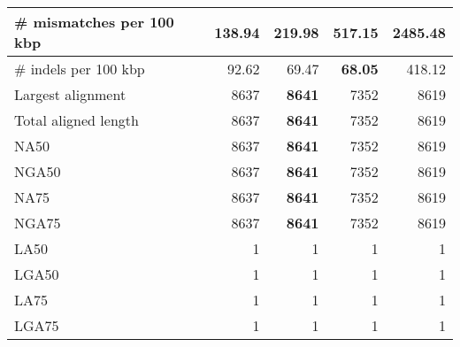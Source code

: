 \documentclass[12pt,a4paper]{article}
\begin{document}
\begin{table}[ht]
\begin{center}
\begin{tabular}{|l*{4}{|r}|}
\# mismatches per 100 kbp & {\bf 138.94} & 219.98 & 517.15 & 2485.48 \\ \hline
\# indels per 100 kbp & 92.62 & 69.47 & {\bf 68.05} & 418.12 \\ \hline
Largest alignment & 8637 & {\bf 8641} & 7352 & 8619 \\ \hline
Total aligned length & 8637 & {\bf 8641} & 7352 & 8619 \\ \hline
NA50 & 8637 & {\bf 8641} & 7352 & 8619 \\ \hline
NGA50 & 8637 & {\bf 8641} & 7352 & 8619 \\ \hline
NA75 & 8637 & {\bf 8641} & 7352 & 8619 \\ \hline
NGA75 & 8637 & {\bf 8641} & 7352 & 8619 \\ \hline
LA50 & 1 & 1 & 1 & 1 \\ \hline
LGA50 & 1 & 1 & 1 & 1 \\ \hline
LA75 & 1 & 1 & 1 & 1 \\ \hline
LGA75 & 1 & 1 & 1 & 1 \\ \hline
\end{tabular}
\end{center}
\end{table}
\end{document}
